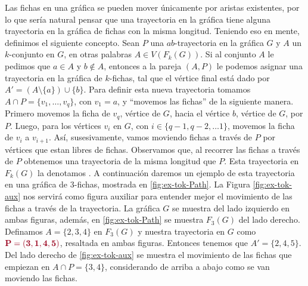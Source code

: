 Las fichas en una gr\'afica se pueden mover \'unicamente por aristas existentes,
por lo que ser\'ia natural pensar que una trayectoria en la gr\'afica tiene
alguna trayectoria en la gr\'afica de fichas con la misma longitud. Teniendo eso
en mente, definimos el siguiente concepto. Sean $P$ una $ab$-trayectoria en la
gr\'afica $G$ y $A$ un $k$-conjunto en $G$, en otras palabras $A \in V(F_k(G))$.
Si al conjunto $A$ le pedimos que $a\in A$ y $b \notin A$, entonces a la pareja
$(A,P)$ le podemos asignar una trayectoria en la gr\'afica de $k$-fichas, tal
que el v\'ertice final est\'a dado por $A'=(A \setminus \{a\}) \cup \{b\}$. Para
definir esta nueva trayectoria tomamos $A\cap P =\{v_1, \dots, v_q\}$, con $v_1
= a$, y ``movemos las fichas'' de la siguiente manera. Primero movemos la ficha
de $v_q$, v\'ertice de $G$, hacia el v\'ertice $b$, v\'ertice de $G$, por $P$.
Luego, para los v\'ertices $v_i$ en $G$, con $i \in \{q-1, q-2, \dots 1\}$,
movemos la ficha de $v_i$ a $v_{i+1}$. As\'i, susesivamente, vamos moviendo
fichas a trav\'es de $P$ por v\'ertices que estan libres de fichas. Observamos
que, al recorrer las fichas a trav\'es de $P$ obtenemos una trayectoria de la
misma longitud que $P$. Esta trayectoria en $F_k(G)$ la denotamos
. A continuaci\'on daremos un
ejemplo de esta trayectoria en una gr\'afica de $3$-fichas, mostrada en
\cref{fig:ex-tok-Path}. La Figura \ref{fig:ex-tok-aux} nos servir\'a como figura
auxiliar para entender mejor el movimiento de las fichas a trav\'es de la
trayectoria. La gr\'afica $G$ se muestra del lado izquierdo en ambas figuras,
adem\'as, en \cref{fig:ex-tok-Path} se muestra $F_3(G)$ del lado derecho.
Definamos $A=\{2,3,4\}$ en $F_3(G)$ y nuestra trayectoria en $G$ como
${\color{vino}\bf P= (3,1,4,5)}$, resaltada en ambas figuras. Entonces tenemos
que $A'=\{2,4,5\}$. Del lado derecho de \cref{fig:ex-tok-aux} se muestra el movimiento
de las fichas que empiezan en $A \cap P =\{3,4\}$, considerando de arriba a
abajo como se van moviendo las fichas.

